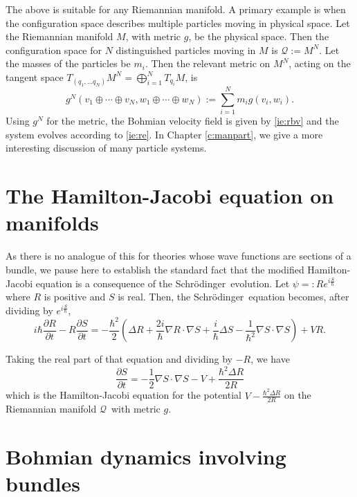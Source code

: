 \documentclass[11pt]{article}
\theoremstyle{remark}
\begin{document}
The above is suitable for any Riemannian manifold. A primary example
 is
 when the configuration space describes multiple particles moving 
in physical
space. Let the Riemannian manifold $M$, with
metric $g$, be the physical space. Then the configuration space for $N$
distinguished particles moving in $M$ is 
$\ensuremath{\mathcal{Q}} \ensuremath{:=} M^{N}$. 
Let the masses of
the particles be $m_i$. Then the relevant metric on $M^N$, acting
on the tangent space $T_{(q_1, \ldots q_N)} M^N =
 \bigoplus_{i=1}^{N} T_{q_i} M$, is  
\begin{equation*} 
g^N(v_1 \oplus \cdots \oplus v_N, w_1 \oplus \cdots \oplus w_N )
\ensuremath{:=} \sum_{i=1}^N m_i g(v_i,w_i).
\end{equation*} 
Using $g^N$ for the metric,  the Bohmian velocity field 
is given by  \eqref{ie:rbv} and the system evolves according to 
 \eqref{ie:re}.  In Chapter \ref{c:manpart}, we give a more
interesting discussion of many particle systems.
 
\section{The Hamilton-Jacobi equation on manifolds} \label{s:hjman}

As there is no analogue of this for theories whose wave functions are sections
of a bundle, we pause here to establish the standard fact that the modified
Hamilton-Jacobi equation is  a consequence of the Schr\"odinger\ evolution.
Let $\ensuremath{\psi} \ensuremath{=:} R e^{i\frac{S}{\hbar}}$ where $R$ is positive and $S$
is real. Then, the Schr\"odinger\ equation
becomes, after dividing by $e^{i\frac{S}{\hbar}}$, 
\[
i \hbar \ensuremath{\frac{\partial {R}}{\partial {t}}} - R \ensuremath{\frac{\partial {S}}{\partial {t}}} 
= -\frac{\hbar^2}{2}( \ensuremath{\Delta} R + \frac{2 i}{\hbar} \nabla R \cdot \nabla
S + \frac{i}{\hbar} \ensuremath{\Delta} S - 
\frac{1}{\hbar^2} \nabla S \cdot \nabla S) + V R.
\]

Taking the real part of that equation and dividing by $-R$, we have 
\[
\ensuremath{\frac{\partial {S}}{\partial {t}}} = -\frac{1}{2} \nabla S \cdot \nabla S - V 
+\frac{\hbar^2 \ensuremath{\Delta} R}{2R}   
\]
which is the Hamilton-Jacobi equation for the potential $V -
\frac{\hbar^2 \ensuremath{\Delta} R}{2R}$ on the Riemannian manifold \ensuremath{\mathcal{Q}}\ with 
 metric $g$.    

\section{Bohmian dynamics involving bundles} \label{s:bbun}
\end{document}
